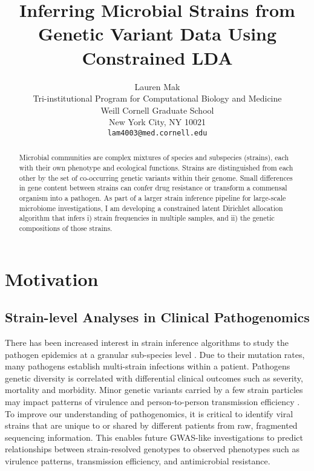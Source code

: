 \documentclass{article}
\title{Inferring Microbial Strains from Genetic Variant Data Using Constrained LDA}
\author{
  Lauren Mak \\
  Tri-institutional Program for Computational Biology and Medicine\\
  Weill Cornell Graduate School\\
  New York City, NY 10021 \\
  \texttt{lam4003@med.cornell.edu} \\
}
\begin{document}
\maketitle

\begin{abstract}
  Microbial communities are complex mixtures of species and subspecies (strains), each with their own phenotype and ecological functions. Strains are distinguished from each other by the set of co-occurring genetic variants within their genome. Small differences in gene content between strains can confer drug resistance or transform a commensal organism into a pathogen. As part of a larger strain inference pipeline for large-scale microbiome investigations, I am developing a constrained latent Dirichlet allocation algorithm that infers i) strain frequencies in multiple samples, and ii) the genetic compositions of those strains.
\end{abstract}

\section{Motivation} \label{Motivation}

\subsection{Strain-level Analyses in Clinical Pathogenomics}

There has been increased interest in strain inference algorithms to study the pathogen epidemics at a granular sub-species level \cite{Sashittal2020}. Due to their mutation rates, many pathogens establish multi-strain infections within a patient. Pathogens genetic diversity is correlated with differential clinical outcomes such as severity, mortality and morbidity. Minor genetic variants carried by a few strain particles may impact patterns of virulence and person-to-person transmission efficiency \cite{DeMendoza2004}. To improve our understanding of pathogenomics, it is critical to identify viral strains that are unique to or shared by different patients from raw, fragmented sequencing information. This enables future GWAS-like investigations to predict relationships between strain-resolved genotypes to observed phenotypes such as virulence patterns, transmission efficiency, and antimicrobial resistance. 

\end{document}
